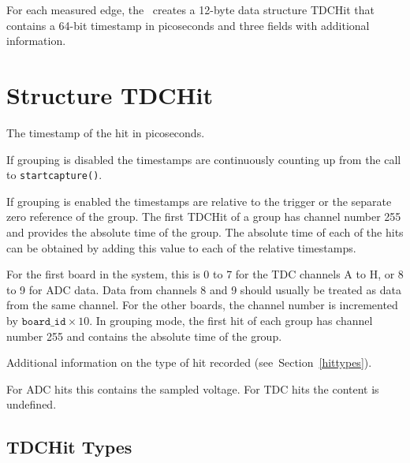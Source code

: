 For each measured edge, the \deviceName\ creates a 12-byte data structure
TDCHit that contains a 64-bit timestamp in picoseconds and three fields with
additional information. 

\section{Structure TDCHit}
\label{TDCHit}
\begin{description}[style=nextline]
    \item[\cronvar{int64\_t}{time}]
    The timestamp of the hit in picoseconds. 

    If grouping is disabled the timestamps are continuously counting up from
    the call to \texttt{\prefix start\tu capture()}.

    If grouping is enabled the timestamps are relative to the trigger or the
    separate zero reference of the group.  The first TDCHit of a group has
    channel number 255 and provides the absolute time of the group.  The
    absolute time of each of the hits can be obtained by adding this value to
    each of the relative timestamps.

    \item[\cronvar{uint8\_t}{channel}]
    For the first board in the system, this is 0 to 7 for the TDC channels A
    to H, or 8 to 9 for ADC data. Data from channels 8 and 9 should usually be
    treated as data from the same channel.  For the other boards, the channel
    number is incremented by $\texttt{board\_id} \times 10$.  In grouping
    mode, the first hit of each group has channel number 255 and contains the
    absolute time of the group.

    \item[\cronvar{uint8\_t}{type}]
    Additional information on the type of hit recorded
    (see~Section~\ref{hittypes}).

    \item[\cronvar{uint16\_t}{bin}]
    For ADC hits this contains the sampled voltage. For TDC hits the content
    is undefined.
\end{description}

\subsection{TDCHit Types \label{hittypes}}
\newcommand{\HTYPE}{\PREFIX TDCHIT\tu TYPE\tu}


